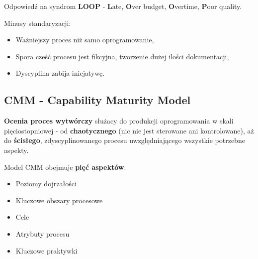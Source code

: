 \documentclass[a4paper]{article}
\begin{document}
    Odpowiedź na syndrom \textbf{LOOP} - \textbf{L}ate, \textbf{O}ver budget, \textbf{O}vertime, \textbf{P}oor quality.

    Minusy standaryzacji:
    \begin{itemize}
        \item Ważniejszy proces niż samo oprogramowanie,
        \item Spora cześć procesu jest fikcyjna, tworzenie dużej ilości dokumentacji,
        \item Dyscyplina zabija inicjatywę.
    \end{itemize}

    \subsection{CMM - Capability Maturity Model}
    \textbf{Ocenia proces wytwórczy} służacy do produkcji oprogramowania w skali pięciostopniowej - od \textbf{chaotycznego} (nic nie jest
    sterowane ani kontrolowane), aż do \textbf{ścisłego}, zdyscyplinowanego procesu uwzględniającego wszystkie potrzebne aspekty.

    Model CMM obejmuje \textbf{pięć aspektów}:
    \begin{itemize}
        \item Poziomy dojrzałości
        \item Kluczowe obszary procesowe
        \item Cele
        \item Atrybuty procesu
        \item Kluczowe praktywki
    \end{itemize}
\end{document}
